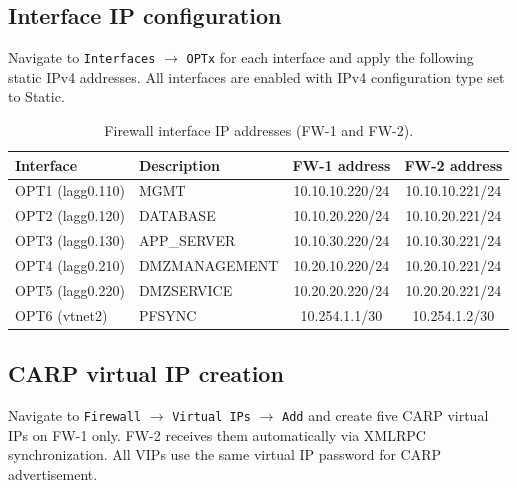 \subsection{Interface IP configuration}

Navigate to \texttt{Interfaces} $\rightarrow$ \texttt{OPTx} for each interface and apply the following static IPv4 addresses. All interfaces are enabled with IPv4 configuration type set to Static.

\begin{table}[htbp]
    \centering
    \small
    \caption{Firewall interface IP addresses (FW-1 and FW-2).}
    \label{tab:fw-ips}
    \begin{tabular}{|l|l|c|c|}
        \hline
        \textbf{Interface} & \textbf{Description} & \textbf{FW-1 address} & \textbf{FW-2 address} \\
        \hline
        OPT1 (lagg0.110) & MGMT & 10.10.10.220/24 & 10.10.10.221/24 \\
        OPT2 (lagg0.120) & DATABASE & 10.10.20.220/24 & 10.10.20.221/24 \\
        OPT3 (lagg0.130) & APP\_SERVER & 10.10.30.220/24 & 10.10.30.221/24 \\
        OPT4 (lagg0.210) & DMZMANAGEMENT & 10.20.10.220/24 & 10.20.10.221/24 \\
        OPT5 (lagg0.220) & DMZSERVICE & 10.20.20.220/24 & 10.20.20.221/24 \\
        OPT6 (vtnet2) & PFSYNC & 10.254.1.1/30 & 10.254.1.2/30 \\
        \hline
    \end{tabular}
\end{table}

\subsection{CARP virtual IP creation}

Navigate to \texttt{Firewall} $\rightarrow$ \texttt{Virtual IPs} $\rightarrow$ \texttt{Add} and create five CARP virtual IPs on FW-1 only. FW-2 receives them automatically via XMLRPC synchronization. All VIPs use the same virtual IP password for CARP advertisement.

